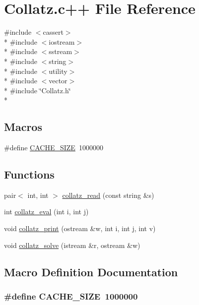\hypertarget{Collatz_8c_09_09}{\section{Collatz.\-c++ File Reference}
\label{Collatz_8c_09_09}
}
{\ttfamily \#include $<$cassert$>$}\\*
{\ttfamily \#include $<$iostream$>$}\\*
{\ttfamily \#include $<$sstream$>$}\\*
{\ttfamily \#include $<$string$>$}\\*
{\ttfamily \#include $<$utility$>$}\\*
{\ttfamily \#include $<$vector$>$}\\*
{\ttfamily \#include \char`\"{}Collatz.\-h\char`\"{}}\\*
\subsection*{Macros}
\begin{DoxyCompactItemize}
\item 
\#define \hyperlink{Collatz_8c_09_09_a8a6befd630ea1c2ab260266f7466540c}{C\-A\-C\-H\-E\-\_\-\-S\-I\-Z\-E}~1000000
\end{DoxyCompactItemize}
\subsection*{Functions}
\begin{DoxyCompactItemize}
\item 
pair$<$ int, int $>$ \hyperlink{Collatz_8c_09_09_a2772f8a734aeab48332eb3b282f991ba}{collatz\-\_\-read} (const string \&s)
\item 
int \hyperlink{Collatz_8c_09_09_a0b0d3827a619c18aa4d96b8ee8b1c47d}{collatz\-\_\-eval} (int i, int j)
\item 
void \hyperlink{Collatz_8c_09_09_aeda0b7ea3e40e1e7487ccc436f33a559}{collatz\-\_\-print} (ostream \&w, int i, int j, int v)
\item 
void \hyperlink{Collatz_8c_09_09_a0ac646d2122741f9a9a52201bf9551cc}{collatz\-\_\-solve} (istream \&r, ostream \&w)
\end{DoxyCompactItemize}


\subsection{Macro Definition Documentation}
\hypertarget{Collatz_8c_09_09_a8a6befd630ea1c2ab260266f7466540c}{
\subsubsection[{C\-A\-C\-H\-E\-\_\-\-S\-I\-Z\-E}]{\setlength{\rightskip}{0pt plus 5cm}\#define C\-A\-C\-H\-E\-\_\-\-S\-I\-Z\-E~1000000}}\label{Collatz_8c_09_09_a8a6befd630ea1c2ab260266f7466540c}


